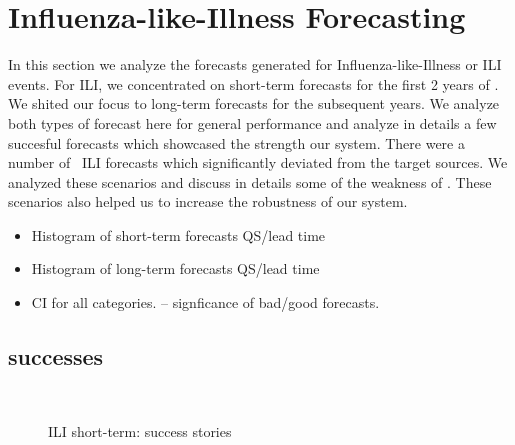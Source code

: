 \section{Influenza-like-Illness Forecasting}
In this section we analyze the forecasts generated for Influenza-like-Illness
or ILI events. For ILI, we concentrated on short-term forecasts for the first 
2 years of \EMBERS. We shited our focus to long-term forecasts for the subsequent
years. We analyze both types of forecast here for general performance and 
analyze in details a few succesful forecasts which showcased the strength 
our system. There were a number of \EMBERS~ILI forecasts which significantly
deviated from the target sources. We analyzed these scenarios and discuss in 
details some of the weakness of \EMBERS. These scenarios also helped us to 
increase the robustness of our system.

\begin{itemize}
  \item Histogram of short-term forecasts QS/lead time
  \item Histogram of long-term forecasts QS/lead time
  \item CI for all categories. -- signficance of bad/good forecasts.
\end{itemize}

\subsection{successes}

\begin{figure}[tb!]
  \\

  \caption{\label{} ILI short-term: success stories}
\end{figure}

